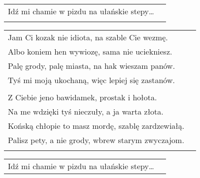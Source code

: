 \documentclass[a5paper]{article}
\begin{document}
\noindent
\begin{tabular}{@{}p{8.00cm}p{3cm}@{}}
Idź mi chamie w pizdu na ułańskie stepy…\\\\
\end{tabular}

\noindent
\begin{tabular}{@{}p{8.00cm}p{3cm}@{}}
Jam Ci kozak nie idiota, na szable Cie wezmę.\\
Albo koniem hen wywiozę, sama nie uciekniesz.\\
Palę grody, palę miasta, na hak wieszam panów.\\
Tyś mi moją ukochaną, więc lepiej się zastanów.\\\\

Z Ciebie jeno bawidamek, prostak i hołota.\\
Na me wdzięki tyś nieczuły, a ja warta złota.\\
Końską chłopie to masz mordę, szablę zardzewiałą.\\
Palisz pety, a nie grody, wbrew starym zwyczajom.\\\\
\end{tabular}

\noindent
\begin{tabular}{@{}p{8.00cm}p{3cm}@{}}
Idź mi chamie w pizdu na ułańskie stepy…
\end{tabular}
\end{document}
